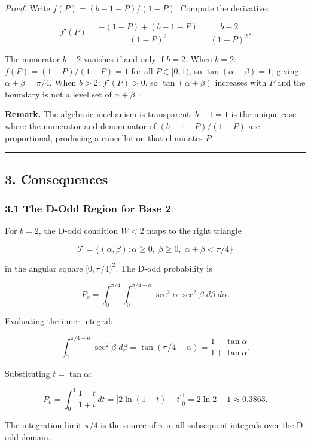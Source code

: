 \documentclass[
  11pt,
]{article}
\begin{document}
\emph{Proof.} Write \(f(P) = (b-1-P)/(1-P)\). Compute the derivative:

\[f'(P) = \frac{-(1-P) + (b-1-P)}{(1-P)^2} = \frac{b - 2}{(1-P)^2}.\]

The numerator \(b - 2\) vanishes if and only if \(b = 2\). When \(b = 2\):
\(f(P) = (1-P)/(1-P) = 1\) for all \(P \in [0,1)\), so
\(\tan(\alpha+\beta) = 1\), giving \(\alpha + \beta = \pi/4\). When \(b > 2\):
\(f'(P) > 0\), so \(\tan(\alpha+\beta)\) increases with \(P\) and the boundary
is not a level set of \(\alpha + \beta\). \(\square\)

\textbf{Remark.} The algebraic mechanism is transparent: \(b - 1 = 1\) is the
unique case where the numerator and denominator of \((b-1-P)/(1-P)\) are
proportional, producing a cancellation that eliminates \(P\).

\begin{center}\rule{0.5\linewidth}{0.5pt}\end{center}

\newpage

\subsection{3. Consequences}\label{consequences}

\subsubsection{3.1 The D-Odd Region for Base
2}\label{the-d-odd-region-for-base-2}

For \(b = 2\), the D-odd condition \(W < 2\) maps to the right triangle

\[\mathcal{T} = \lbrace{}(\alpha, \beta) : \alpha \geq 0,\; \beta \geq 0,\; \alpha + \beta < \pi/4\rbrace{}\]

in the angular square \([0, \pi/4)^2\). The D-odd probability is

\[P_o = \int_0^{\pi/4}\!\int_0^{\pi/4 - \alpha} \sec^2\!\alpha\;\sec^2\!\beta\;d\beta\;d\alpha.\]

Evaluating the inner integral:

\[\int_0^{\pi/4 - \alpha}\sec^2\!\beta\;d\beta = \tan(\pi/4 - \alpha) = \frac{1 - \tan\alpha}{1 + \tan\alpha}.\]

Substituting \(t = \tan\alpha\):

\[P_o = \int_0^1 \frac{1-t}{1+t}\,dt = \bigl[2\ln(1+t) - t\bigr]_0^1 = 2\ln 2 - 1 \approx 0.3863.\]

The integration limit \(\pi/4\) is the source of \(\pi\) in all subsequent
integrals over the D-odd domain.
\end{document}

